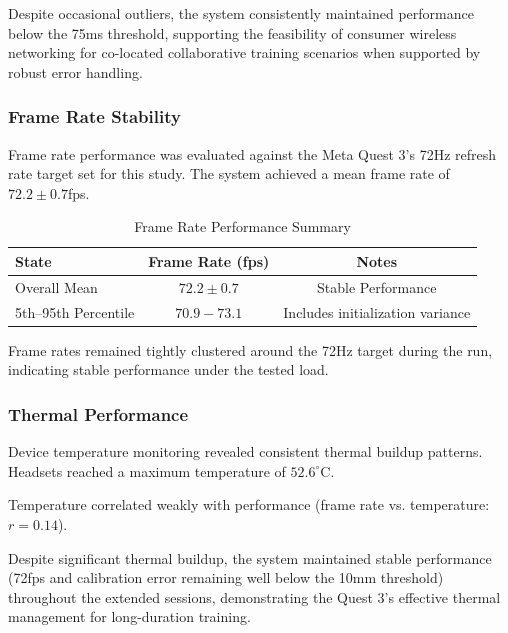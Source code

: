 Despite occasional outliers, the system consistently maintained performance below the 75ms threshold, supporting the feasibility of consumer wireless networking for co-located collaborative training scenarios when supported by robust error handling.

\subsubsection{Frame Rate Stability}

Frame rate performance was evaluated against the Meta Quest 3's 72Hz refresh rate target set for this study. The system achieved a mean frame rate of $72.2 \pm 0.7$fps. 

\begin{table}[h]
\centering
\caption{Frame Rate Performance Summary}
\begin{tabular}{|l|c|c|}
\hline
\textbf{State} & \textbf{Frame Rate (fps)} & \textbf{Notes} \\
\hline
Overall Mean & $72.2 \pm 0.7$ & Stable Performance \\
5th--95th Percentile & $70.9 - 73.1$ & Includes initialization variance \\
\hline
\end{tabular}
\end{table}

Frame rates remained tightly clustered around the 72Hz target during the run, indicating stable performance under the tested load.



\subsubsection{Thermal Performance}

Device temperature monitoring revealed consistent thermal buildup patterns. Headsets reached a maximum temperature of $52.6^{\circ}$C.

Temperature correlated weakly with performance (frame rate vs. temperature: $r=0.14$).

Despite significant thermal buildup, the system maintained stable performance (72fps and calibration error remaining well below the 10mm threshold) throughout the extended sessions, demonstrating the Quest 3's effective thermal management for long-duration training.
